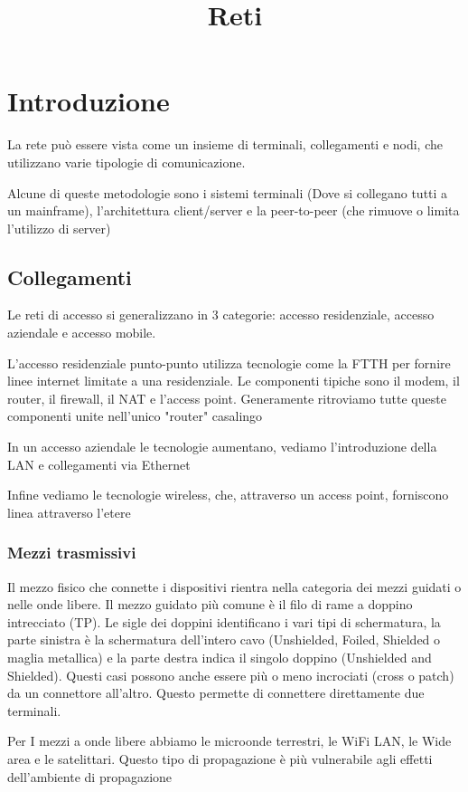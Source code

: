 \documentclass[12pt, a4paper]{article}
\title{Reti}
\begin{document}
\section{Introduzione}

La rete può essere vista come un insieme di terminali, collegamenti e nodi, che utilizzano varie tipologie di comunicazione.

Alcune di queste metodologie sono i sistemi terminali (Dove si collegano tutti a un mainframe), l'architettura client/server 
e la peer-to-peer (che rimuove o limita l'utilizzo di server)

\subsection{Collegamenti}
Le reti di accesso si generalizzano in 3 categorie: accesso residenziale, accesso aziendale e accesso mobile.

L'accesso residenziale punto-punto utilizza tecnologie come la FTTH per fornire linee internet limitate a una residenziale.
Le componenti tipiche sono il modem, il router, il firewall, il NAT e l'access point. Generamente ritroviamo tutte queste 
componenti unite nell'unico "router" casalingo

In un accesso aziendale le tecnologie aumentano, vediamo l'introduzione della LAN e collegamenti via Ethernet

Infine vediamo le tecnologie wireless, che, attraverso un access point, forniscono linea attraverso l'etere

\subsubsection*{Mezzi trasmissivi}
Il mezzo fisico che connette i dispositivi rientra nella categoria dei mezzi guidati o nelle onde libere. Il mezzo guidato
più comune è il filo di rame a doppino intrecciato (TP). Le sigle dei doppini identificano i vari tipi di schermatura, 
la parte sinistra è la schermatura dell'intero cavo (Unshielded, Foiled, Shielded o maglia metallica) e la parte destra 
indica il singolo doppino (Unshielded and Shielded). Questi casi possono anche essere più o meno incrociati (cross o patch)
da un connettore all'altro. Questo permette di connettere direttamente due terminali. 


Per I mezzi a onde libere abbiamo le microonde terrestri, le WiFi LAN, le Wide area e le satelittari. Questo tipo di 
propagazione è più vulnerabile agli effetti dell'ambiente di propagazione
\end{document}
